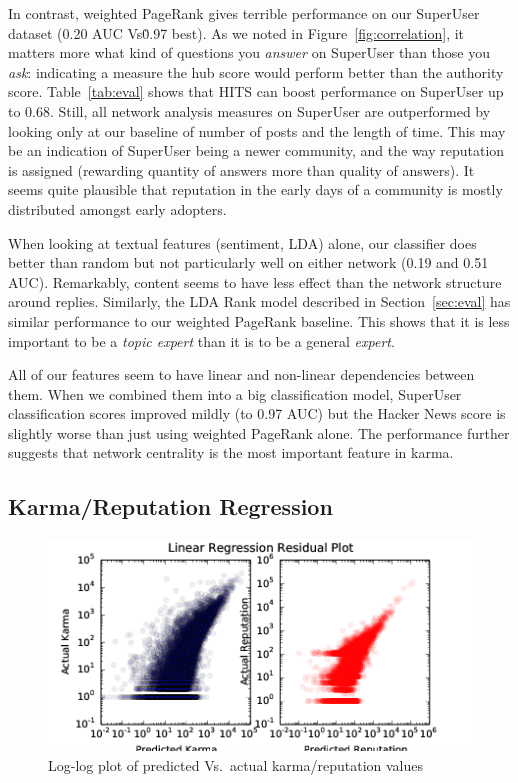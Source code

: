 \documentclass[11pt]{article}
\begin{document}
In contrast, weighted PageRank gives terrible performance on our SuperUser dataset
(0.20 AUC Vs\. 0.97 best). As we noted in Figure~\ref{fig:correlation}, it matters
more what kind of questions you \textit{answer} on SuperUser than those you 
\textit{ask}: indicating a measure the hub score would perform better than
the authority score. Table~\ref{tab:eval} shows that HITS can boost performance
on SuperUser up to 0.68. Still, all network analysis measures on SuperUser 
are outperformed by looking only at our baseline of number of posts and the length
of time. This may be an indication of SuperUser being a newer community, and the
way reputation is assigned (rewarding quantity of answers more than quality of answers).
It seems quite plausible that reputation in the early days of a community is mostly
distributed amongst early adopters.

When looking at textual features (sentiment, LDA) alone, our classifier does better than random 
but not particularly well on either network (0.19 and 0.51 AUC). Remarkably, content
seems to have less effect than the network structure around replies. Similarly, the LDA Rank model 
described in Section~\ref{sec:eval} has similar performance to our weighted PageRank baseline. 
This shows that it is less important to be a \textit{topic expert} than it is to be a general
\textit{expert}.

All of our features seem to have linear and non-linear dependencies between them. When we combined
them into a big classification model, SuperUser classification scores improved mildly (to 0.97 AUC)
but the Hacker News score is slightly worse than just using weighted PageRank alone. The performance
further suggests that network centrality is the most important feature in karma.

\subsection{Karma/Reputation Regression}
\label{sec:regression}
\begin{figure}[h]
\centering
\includegraphics[width=\linewidth]{residuals-png}
\caption{Log-log plot of predicted Vs.\ actual karma/reputation values}
\label{fig:residuals}
\end{figure}
\end{document}
